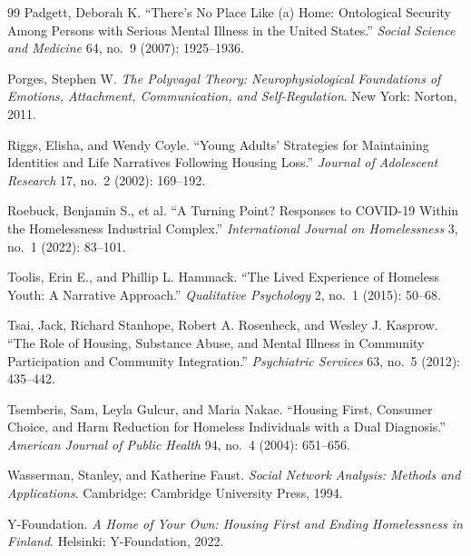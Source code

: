\documentclass[12pt, letterpaper]{article}
\begin{document}
\begin{thebibliography}{99}
Padgett, Deborah K. ``There's No Place Like (a) Home: Ontological Security Among Persons with Serious Mental Illness in the United States.'' \textit{Social Science and Medicine} 64, no.\ 9 (2007): 1925--1936.

Porges, Stephen W. \textit{The Polyvagal Theory: Neurophysiological Foundations of Emotions, Attachment, Communication, and Self-Regulation}. New York: Norton, 2011.

Riggs, Elisha, and Wendy Coyle. ``Young Adults' Strategies for Maintaining Identities and Life Narratives Following Housing Loss.'' \textit{Journal of Adolescent Research} 17, no.\ 2 (2002): 169--192.

Roebuck, Benjamin S., et al. ``A Turning Point? Responses to COVID-19 Within the Homelessness Industrial Complex.'' \textit{International Journal on Homelessness} 3, no.\ 1 (2022): 83--101.

Toolis, Erin E., and Phillip L. Hammack. ``The Lived Experience of Homeless Youth: A Narrative Approach.'' \textit{Qualitative Psychology} 2, no.\ 1 (2015): 50--68.

Tsai, Jack, Richard Stanhope, Robert A. Rosenheck, and Wesley J. Kasprow. ``The Role of Housing, Substance Abuse, and Mental Illness in Community Participation and Community Integration.'' \textit{Psychiatric Services} 63, no.\ 5 (2012): 435--442.

Tsemberis, Sam, Leyla Gulcur, and Maria Nakae. ``Housing First, Consumer Choice, and Harm Reduction for Homeless Individuals with a Dual Diagnosis.'' \textit{American Journal of Public Health} 94, no.\ 4 (2004): 651--656.

Wasserman, Stanley, and Katherine Faust. \textit{Social Network Analysis: Methods and Applications}. Cambridge: Cambridge University Press, 1994.

Y-Foundation. \textit{A Home of Your Own: Housing First and Ending Homelessness in Finland}. Helsinki: Y-Foundation, 2022.

\end{thebibliography}
\end{document}
